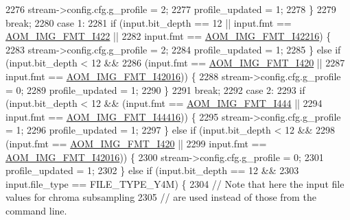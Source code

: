 \begin{DoxyCodeInclude}
{{{{{{{{{{{{{{{{{{{{{{{{{{{{{{{{{{{{{{{{{{{{{{{{{{{{2276               stream->config.cfg.g\_profile = 2;
2277               profile\_updated = 1;
2278             \}
2279             \textcolor{keywordflow}{break};
2280           \textcolor{keywordflow}{case} 1:
2281             \textcolor{keywordflow}{if} (input.bit\_depth == 12 || input.fmt == \hyperlink{aom__image_8h_a930317c04b4bd0a660bb5e744055523cab2f75281e94ebc0f0bc728ef287cd3e8}{AOM\_IMG\_FMT\_I422} ||
2282                 input.fmt == \hyperlink{aom__image_8h_a930317c04b4bd0a660bb5e744055523ca064683ed4260fc6244af6cfc9d261c22}{AOM\_IMG\_FMT\_I42216}) \{
2283               stream->config.cfg.g\_profile = 2;
2284               profile\_updated = 1;
2285             \} \textcolor{keywordflow}{else} \textcolor{keywordflow}{if} (input.bit\_depth < 12 &&
2286                        (input.fmt == \hyperlink{aom__image_8h_a930317c04b4bd0a660bb5e744055523cabd778a3d697463e89d12a1117f417b60}{AOM\_IMG\_FMT\_I420} ||
2287                         input.fmt == \hyperlink{aom__image_8h_a930317c04b4bd0a660bb5e744055523ca20a9cf30277260685642b4cfb4e9273b}{AOM\_IMG\_FMT\_I42016})) \{
2288               stream->config.cfg.g\_profile = 0;
2289               profile\_updated = 1;
2290             \}
2291             \textcolor{keywordflow}{break};
2292           \textcolor{keywordflow}{case} 2:
2293             \textcolor{keywordflow}{if} (input.bit\_depth < 12 && (input.fmt == \hyperlink{aom__image_8h_a930317c04b4bd0a660bb5e744055523ca89d423506e948ab7d3b98b5750b92655}{AOM\_IMG\_FMT\_I444} ||
2294                                          input.fmt == \hyperlink{aom__image_8h_a930317c04b4bd0a660bb5e744055523cab9b93d397dedbdd6bfafec84d1f8f0f5}{AOM\_IMG\_FMT\_I44416})) \{
2295               stream->config.cfg.g\_profile = 1;
2296               profile\_updated = 1;
2297             \} \textcolor{keywordflow}{else} \textcolor{keywordflow}{if} (input.bit\_depth < 12 &&
2298                        (input.fmt == \hyperlink{aom__image_8h_a930317c04b4bd0a660bb5e744055523cabd778a3d697463e89d12a1117f417b60}{AOM\_IMG\_FMT\_I420} ||
2299                         input.fmt == \hyperlink{aom__image_8h_a930317c04b4bd0a660bb5e744055523ca20a9cf30277260685642b4cfb4e9273b}{AOM\_IMG\_FMT\_I42016})) \{
2300               stream->config.cfg.g\_profile = 0;
2301               profile\_updated = 1;
2302             \} \textcolor{keywordflow}{else} \textcolor{keywordflow}{if} (input.bit\_depth == 12 &&
2303                        input.file\_type == FILE\_TYPE\_Y4M) \{
2304               \textcolor{comment}{// Note that here the input file values for chroma subsampling}
2305               \textcolor{comment}{// are used instead of those from the command line.}
}}}}}}}}}}}}}}}}}}}}}}}}}}}}}}}}}}}}}}}}}}}}}}}}}}}}
\end{DoxyCodeInclude}
